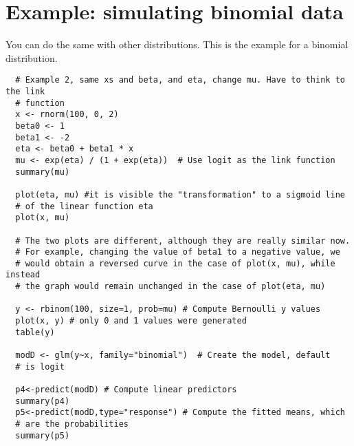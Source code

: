 \section{Example: simulating binomial data} %
You can do the same with other distributions. This is the example for a
binomial distribution.

\begin{verbatim}
  # Example 2, same xs and beta, and eta, change mu. Have to think to the link
  # function 
  x <- rnorm(100, 0, 2)  
  beta0 <- 1
  beta1 <- -2  
  eta <- beta0 + beta1 * x  
  mu <- exp(eta) / (1 + exp(eta))  # Use logit as the link function
  summary(mu)
  
  plot(eta, mu) #it is visible the "transformation" to a sigmoid line
  # of the linear function eta
  plot(x, mu)
  
  # The two plots are different, although they are really similar now.
  # For example, changing the value of beta1 to a negative value, we 
  # would obtain a reversed curve in the case of plot(x, mu), while instead 
  # the graph would remain unchanged in the case of plot(eta, mu)
  
  y <- rbinom(100, size=1, prob=mu) # Compute Bernoulli y values 
  plot(x, y) # only 0 and 1 values were generated
  table(y)
  
  modD <- glm(y~x, family="binomial")  # Create the model, default
  # is logit
  
  p4<-predict(modD) # Compute linear predictors 
  summary(p4)
  p5<-predict(modD,type="response") # Compute the fitted means, which 
  # are the probabilities 
  summary(p5)
\end{verbatim}

